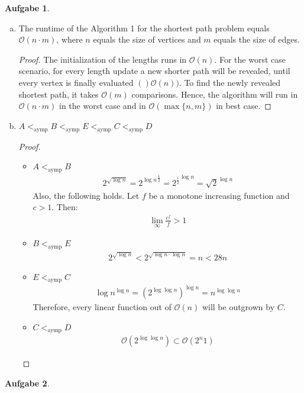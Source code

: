 \documentclass[a4paper,12pt,headsepline]{scrartcl}
\newtheorem{aufgabe}{Aufgabe}
\begin{document}
\begin{aufgabe}
\end{aufgabe}

\begin{enumerate}[a)]
	\item The runtime of the Algorithm 1 for the shortest path problem equals $\mathcal{O}(n\cdot m)$, where $n$ equals the size of vertices and $m$ equals the size of edges.
	\begin{proof}
		The initialization of the lengths runs in $\mathcal{O}(n)$. For the worst case scenario, for every length update a new shorter path will be revealed, until every vertex is finally evaluated $()\mathcal{O}(n))$. To find the newly revealed shortest path, it takes $\mathcal{O}(m)$ comparisons. Hence, the algorithm will run in $\mathcal{O}(n\cdot m)$ in the worst case and in $\mathcal{O}(\max\{n,m\})$ in best case.
	\end{proof}
	\item $A <_{\text{aymp}} B<_{\text{aymp}} E <_{\text{aymp}} C <_{\text{aymp}} D$
	\begin{proof}
		\begin{itemize}
			\item $A <_{\text{aymp}} B$
			\begin{align*}
				 2^{\sqrt{\log n}} = {2^{\log n}}^{\frac{1}{2}} = {2^{\frac{1}{2}}}^{\log n} = \sqrt{2}^{\log n}
			\end{align*}
			Also, the following holds. Let $f$ be a monotone increasing function and $c > 1$. Then:
			\begin{align*}
				\lim\limits_{\infty}\frac{c^f}{f} > 1
			\end{align*}
			\item $B <_{\text{aymp}} E$
			\begin{align*}
				2^{\sqrt{\log n}} < 2^{\sqrt{\log n \cdot \log n}} = n < 28n
			\end{align*}
			\item $E <_{\text{aymp}} C$
			\begin{align*}
				\log n^{\log n} = (2^{\log \log n})^{\log n}= n^{\log \log n}
			\end{align*}
			Therefore, every linear function out of $\mathcal{O}(n)$ will be outgrown by $C$.
			\item $C <_{\text{aymp}} D$
			\begin{align*}
				\mathcal{O}(2^{\log \log n}) \subset \mathcal{O}(2^n1)
			\end{align*}
		\end{itemize}
	\end{proof} 
\end{enumerate}

\begin{aufgabe}
\end{aufgabe}
\end{document}
